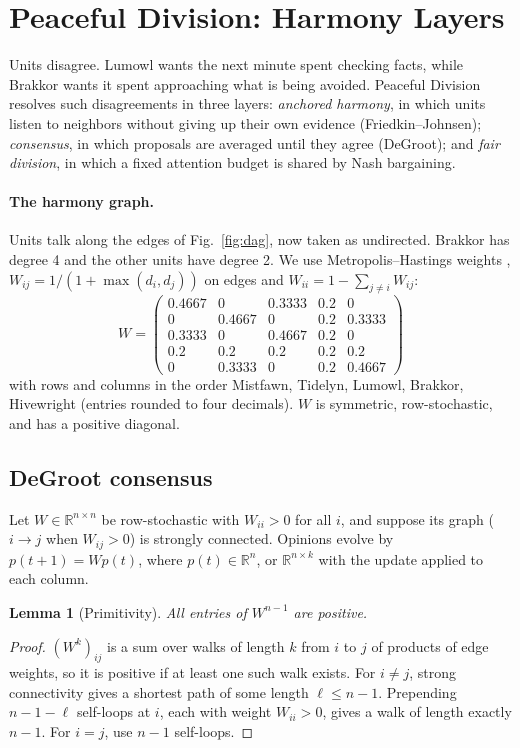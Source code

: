 \documentclass[11pt]{article}
\newtheorem{lemma}{Lemma}
\theoremstyle{definition}
\theoremstyle{remark}
\newcommand{\R}{\mathbb{R}}
\begin{document}
\section{Peaceful Division: Harmony Layers}\label{sec:peace}
Units disagree. Lumowl wants the next minute spent checking facts, while Brakkor wants it spent approaching what is being avoided. Peaceful Division resolves such disagreements in three layers: \emph{anchored harmony}, in which units listen to neighbors without giving up their own evidence (Friedkin--Johnsen); \emph{consensus}, in which proposals are averaged until they agree (DeGroot); and \emph{fair division}, in which a fixed attention budget is shared by Nash bargaining.

\paragraph{The harmony graph.} Units talk along the edges of Fig.~\ref{fig:dag}, now taken as undirected. Brakkor has degree 4 and the other units have degree 2. We use Metropolis--Hastings weights \citep{xiao2004}, $W_{ij}=1/(1+\max(d_i,d_j))$ on edges and $W_{ii}=1-\sum_{j\ne i}W_{ij}$:
\[
W=\begin{pmatrix}
0.4667&0&0.3333&0.2&0\\
0&0.4667&0&0.2&0.3333\\
0.3333&0&0.4667&0.2&0\\
0.2&0.2&0.2&0.2&0.2\\
0&0.3333&0&0.2&0.4667
\end{pmatrix}
\]
with rows and columns in the order Mistfawn, Tidelyn, Lumowl, Brakkor, Hivewright (entries rounded to four decimals).
$W$ is symmetric, row-stochastic, and has a positive diagonal.

\subsection{DeGroot consensus}
Let $W\in\R^{n\times n}$ be row-stochastic with $W_{ii}>0$ for all $i$, and suppose its graph ($i\to j$ when $W_{ij}>0$) is strongly connected. Opinions evolve by $p(t+1)=Wp(t)$, where $p(t)\in\R^n$, or $\R^{n\times k}$ with the update applied to each column.

\begin{lemma}[Primitivity]\label{lem:primitive}
All entries of $W^{n-1}$ are positive.
\end{lemma}
\begin{proof}
$(W^k)_{ij}$ is a sum over walks of length $k$ from $i$ to $j$ of products of edge weights, so it is positive if at least one such walk exists. For $i\ne j$, strong connectivity gives a shortest path of some length $\ell\le n-1$. Prepending $n-1-\ell$ self-loops at $i$, each with weight $W_{ii}>0$, gives a walk of length exactly $n-1$. For $i=j$, use $n-1$ self-loops.
\end{proof}
\end{document}
